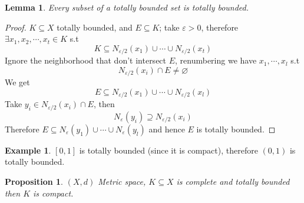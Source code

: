 \documentclass[11pt,a4paper]{article}
\theoremstyle{definition}
\newtheorem{example}[definition]{Example}
\theoremstyle{plain}
\newtheorem{lemma}[definition]{Lemma}
\newtheorem{proposition}[definition]{Proposition}
\theoremstyle{remark}
\begin{document}
\begin{lemma}
    Every subset of a totally bounded set is totally bounded. 
\end{lemma}

\begin{proof}
    $K \subseteq X$ totally bounded, and $E \subseteq K$; take $\varepsilon > 0$, therefore $\exists x_1, x_2, \cdots, x_t \in K$ s.t 
    $$K \subseteq N_{\varepsilon/2}(x_1) \cup \cdots \cup N_{\varepsilon/2} (x_t)$$
    Ignore the neighborhood that don't intersect $E$, renumbering we have $x_1, \cdots, x_l$ s.t 
    $$N_{\varepsilon/2} (x_i) \cap E \neq \varnothing$$
    We get 
    $$E \subseteq N_{\varepsilon/2} (x_1) \cup \cdots \cup N_{\varepsilon/2} (x_l)$$
    Take $y_i \in N_{\varepsilon/2} (x_i) \cap E$, then 
    $$N_{\varepsilon} (y_i) \supseteq N_{\varepsilon/2} (x_i)$$
    Therefore $E \subseteq N_{\varepsilon}(y_1) \cup \cdots \cup N_{\varepsilon} (y_l)$ and hence $E$ is totally bounded. 
\end{proof}

\begin{example}
    $[0,1]$ is totally bounded (since it is compact), therefore $(0,1)$ is totally bounded.  
\end{example}

\begin{proposition}
    $(X,d)$ Metric space, $K \subseteq X$ is complete and totally bounded then $K$ is compact. 
\end{proposition}
\end{document}
